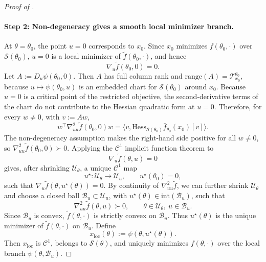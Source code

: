 \documentclass{article}
\theoremstyle{normaltheorem}
\newcommand{\calS}{\mathcal{S}}
\newcommand{\calT}{\mathcal{T}}
\begin{document}
\begin{proof}[Proof of ]
\paragraph{Step 2: Non-degeneracy gives a smooth local minimizer branch.}
At \(\theta=\theta_0\), the point \(u=0\) corresponds to \(x_0\). Since \(x_0\) minimizes \(f(\theta_0,\cdot)\) over
\(\calS(\theta_0)\), \(u=0\) is a local minimizer of \(\tilde f(\theta_0,\cdot)\), and hence
\[
\nabla_u\tilde f(\theta_0,0)=0.
\]
Let \(A:=D_u\psi(\theta_0,0)\). Then \(A\) has full column rank and
\(\mathrm{range}(A)=\calT_{x_0}^{\theta_0}\), because \(u\mapsto\psi(\theta_0,u)\) is an embedded chart for
\(\calS(\theta_0)\) around \(x_0\). Because \(u=0\) is a critical point of the restricted objective, the
second-derivative terms of the chart do not contribute to the Hessian quadratic form at \(u=0\). Therefore, for every
\(w\neq0\), with \(v:=Aw\),
\[
w^\top\nabla^2_{uu}\tilde f(\theta_0,0)w
=
\big\langle v,\mathrm{Hess}_{\calS(\theta_0)}\bar f_{\theta_0}(x_0)[v]\big\rangle .
\]
The non-degeneracy assumption makes the right-hand side positive for all \(w\neq0\), so
\(\nabla^2_{uu}\tilde f(\theta_0,0)\succ0\). Applying the \(\mathcal C^1\) implicit function theorem to
\[
\nabla_u\tilde f(\theta,u)=0
\]
gives, after shrinking \(\mathcal U_\theta\), a unique \(\mathcal C^1\) map
\[
u^\star:\mathcal U_\theta\to\mathcal U_u,\qquad u^\star(\theta_0)=0,
\]
such that \(\nabla_u\tilde f(\theta,u^\star(\theta))=0\). By continuity of \(\nabla^2_{uu}\tilde f\), we can further
shrink \(\mathcal U_\theta\) and choose a closed ball \(\mathcal B_u\subset\mathcal U_u\), with
\(u^\star(\theta)\in\mathrm{int}(\mathcal B_u)\), such that
\[
\nabla^2_{uu}\tilde f(\theta,u)\succ0,
\qquad
\theta\in\mathcal U_\theta,\ u\in\mathcal B_u .
\]
Since \(\mathcal B_u\) is convex, \(\tilde f(\theta,\cdot)\) is strictly convex on \(\mathcal B_u\). Thus
\(u^\star(\theta)\) is the unique minimizer of \(\tilde f(\theta,\cdot)\) on \(\mathcal B_u\). Define
\[
x_{\mathrm{loc}}(\theta):=\psi(\theta,u^\star(\theta)).
\]
Then \(x_{\mathrm{loc}}\) is \(\mathcal C^1\), belongs to \(\calS(\theta)\), and uniquely minimizes \(f(\theta,\cdot)\)
over the local branch \(\psi(\theta,\mathcal B_u)\).


\end{proof}
\end{document}
